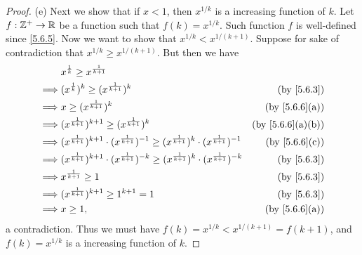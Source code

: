 \begin{proof}{(e)}
  Next we show that if \(x < 1\), then \(x^{1 / k}\) is a increasing function of \(k\).
  Let \(f : \mathbb{Z}^+ \to \mathbb{R}\) be a function such that \(f(k) = x^{1 / k}\).
  Such function \(f\) is well-defined since \cref{5.6.5}.
  Now we want to show that \(x^{1 / k} < x^{1 / (k + 1)}\).
  Suppose for sake of contradiction that \(x^{1 / k} \geq x^{1 / (k + 1)}\).
  But then we have
  \begin{align*}
             & x^{\frac{1}{k}} \geq x^{\frac{1}{k + 1}}                                                                                                                      \\
    \implies & (x^{\frac{1}{k}})^k \geq (x^{\frac{1}{k + 1}})^k                                                                             & \text{(by \cref{5.6.3})}       \\
    \implies & x \geq (x^{\frac{1}{k + 1}})^k                                                                                               & \text{(by \cref{5.6.6}(a))}    \\
    \implies & (x^{\frac{1}{k + 1}})^{k + 1} \geq (x^{\frac{1}{k + 1}})^k                                                                   & \text{(by \cref{5.6.6}(a)(b))} \\
    \implies & (x^{\frac{1}{k + 1}})^{k + 1} \cdot (x^{\frac{1}{k + 1}})^{-1} \geq (x^{\frac{1}{k + 1}})^k \cdot (x^{\frac{1}{k + 1}})^{-1} & \text{(by \cref{5.6.6}(c))}    \\
    \implies & (x^{\frac{1}{k + 1}})^{k + 1} \cdot (x^{\frac{1}{k + 1}})^{-k} \geq (x^{\frac{1}{k + 1}})^k \cdot (x^{\frac{1}{k + 1}})^{-k} & \text{(by \cref{5.6.3})}       \\
    \implies & x^{\frac{1}{k + 1}} \geq 1                                                                                                   & \text{(by \cref{5.6.3})}       \\
    \implies & (x^{\frac{1}{k + 1}})^{k + 1} \geq 1^{k + 1} = 1                                                                             & \text{(by \cref{5.6.3})}       \\
    \implies & x \geq 1,                                                                                                                    & \text{(by \cref{5.6.6}(a))}
  \end{align*}
  a contradiction.
  Thus we must have \(f(k) = x^{1 / k} < x^{1 / (k + 1)} = f(k + 1)\), and \(f(k) = x^{1 / k}\) is a increasing function of \(k\).


\end{proof}
